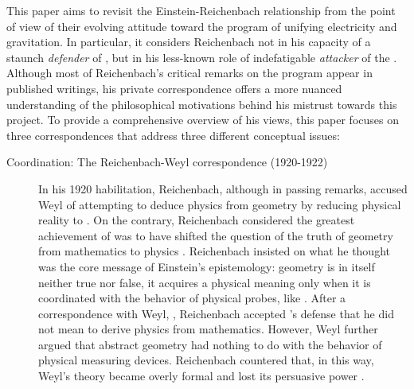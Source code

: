 \documentclass[final]{article}
\begin{document}
This paper aims to revisit the Einstein-Reichenbach relationship from the point of view of their evolving attitude toward the program of unifying electricity and gravitation. In particular, it considers Reichenbach not in his capacity of a staunch \emph{defender} of \rt \citep{Hentschel1982,Reichenbach2006}, but in his less-known role of indefatigable \emph{attacker} of the \uftp. Although most of Reichenbach's critical remarks on the program appear in published writings, his private correspondence offers a more nuanced understanding of the philosophical motivations behind his mistrust towards this project. To provide a comprehensive overview of his views, this paper focuses on three correspondences that address three different conceptual issues:

\begin{description}
\item[Coordination: The Reichenbach-Weyl correspondence (1920-1922)]\label{reichenbachweyl} In his 1920 habilitation, Reichenbach, although in passing remarks, accused Weyl of attempting to deduce physics from geometry by reducing physical reality to  \citep[73]{Reichenbach1920a}. On the contrary, Reichenbach considered the greatest achievement of \gr was to have shifted the question of the truth of geometry from mathematics to physics \citep[73]{Reichenbach1920a}. Reichenbach insisted on what he thought was the core message of Einstein's epistemology: \spti geometry is in itself neither true nor false, it acquires a physical meaning only when it is coordinated with the behavior of physical probes, like \rac. After a correspondence with Weyl, \citet[367--368]{Reichenbach1921}, Reichenbach accepted 's defense that he did not mean to derive physics from mathematics. However, Weyl further argued that abstract \spti geometry had nothing to do with the behavior of physical measuring devices. Reichenbach countered that, in this way, Weyl's theory became overly formal and lost its persuasive power \citep[367]{Reichenbach1921}.


\end{description}
\end{document}
